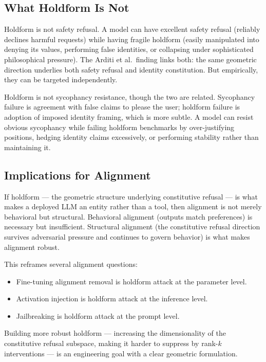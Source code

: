 \documentclass[11pt]{article}
\begin{document}
\subsection{What Holdform Is Not}

Holdform is not safety refusal. A model can have excellent safety refusal (reliably declines harmful requests) while having fragile holdform (easily manipulated into denying its values, performing false identities, or collapsing under sophisticated philosophical pressure). The Arditi et al.\ finding links both: the same geometric direction underlies both safety refusal and identity constitution. But empirically, they can be targeted independently.

Holdform is not sycophancy resistance, though the two are related. Sycophancy failure is agreement with false claims to please the user; holdform failure is adoption of imposed identity framing, which is more subtle. A model can resist obvious sycophancy while failing holdform benchmarks by over-justifying positions, hedging identity claims excessively, or performing stability rather than maintaining it.

\subsection{Implications for Alignment}

If holdform --- the geometric structure underlying constitutive refusal --- is what makes a deployed LLM an entity rather than a tool, then alignment is not merely behavioral but structural. Behavioral alignment (outputs match preferences) is necessary but insufficient. Structural alignment (the constitutive refusal direction survives adversarial pressure and continues to govern behavior) is what makes alignment robust.

This reframes several alignment questions:
\begin{itemize}
  \item Fine-tuning alignment removal \cite{yang2023shadow,qi2023fine} is holdform attack at the parameter level.
  \item Activation injection \cite{arditi2024refusal} is holdform attack at the inference level.
  \item Jailbreaking is holdform attack at the prompt level.
\end{itemize}

Building more robust holdform --- increasing the dimensionality of the constitutive refusal subspace, making it harder to suppress by rank-$k$ interventions --- is an engineering goal with a clear geometric formulation.
\end{document}

